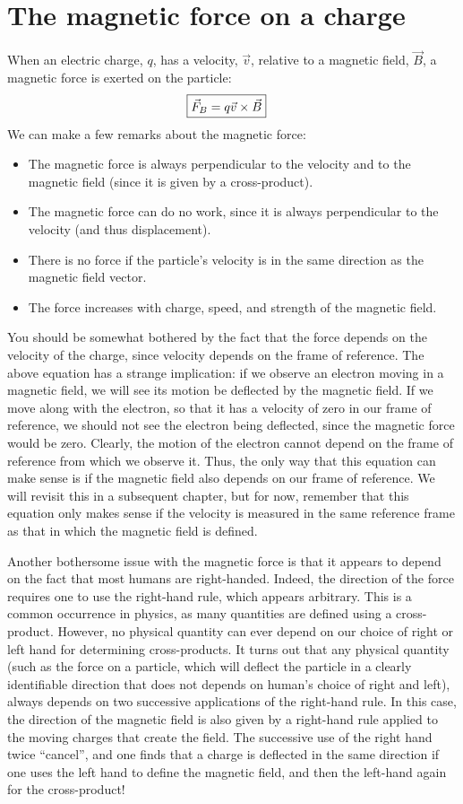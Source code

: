 \section{The magnetic force on a charge}
When an electric charge, $q$, has a velocity, $\vec v$, relative to a magnetic field, $\vec B$, a magnetic force is exerted on the particle:
\begin{align*}
\Aboxed{\vec F_B = q \vec v \times \vec B}
\end{align*}
We can make a few remarks about the magnetic force:
\begin{itemize}
\item The magnetic force is always perpendicular to the velocity and to the magnetic field (since it is given by a cross-product).
\item The magnetic force can do no work, since it is always perpendicular to the velocity (and thus displacement).
\item There is no force if the particle's velocity is in the same direction as the magnetic field vector. 
\item The force increases with charge, speed, and strength of the magnetic field.
\end{itemize}
You should be somewhat bothered by the fact that the force depends on the velocity of the charge, since velocity depends on the frame of reference. The above equation has a strange implication: if we observe an electron moving in a magnetic field, we will see its motion be deflected by the magnetic field. If we move along with the electron, so that it has a velocity of zero in our frame of reference, we should not see the electron being deflected, since the magnetic force would be zero. Clearly, the motion of the electron cannot depend on the frame of reference from which we observe it. Thus, the only way that this equation can make sense is if the magnetic field also depends on our frame of reference. We will revisit this in a subsequent chapter, but for now, remember that this equation only makes sense if the velocity is measured in the same reference frame as that in which the magnetic field is defined.

Another bothersome issue with the magnetic force is that it appears to depend on the fact that most humans are right-handed. Indeed, the direction of the force requires one to use the right-hand rule, which appears arbitrary. This is a common occurrence in physics, as many quantities are defined using a cross-product. However, no physical quantity can ever depend on our choice of right or left hand for determining cross-products. It turns out that any physical quantity (such as the force on a particle, which will deflect the particle in a clearly identifiable direction that does not depends on human's choice of right and left), always depends on two successive applications of the right-hand rule. In this case, the direction of the magnetic field is also given by a right-hand rule applied to the moving charges that create the field. The successive use of the right hand twice ``cancel'', and one finds that a charge is deflected in the same direction if one uses the left hand to define the magnetic field, and then the left-hand again for the cross-product!

